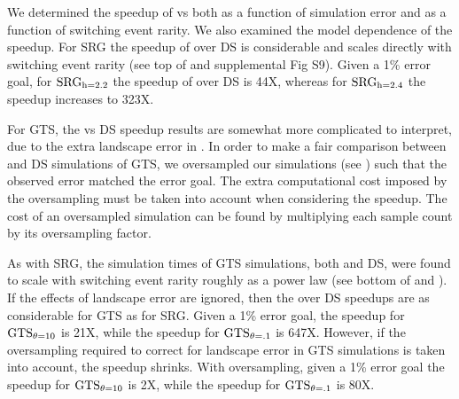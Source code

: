 We determined the speedup of  vs  both as a function of simulation error and as a function of switching event rarity. We also examined the model dependence of the speedup. For SRG the speedup of  over DS is considerable and scales directly with switching event rarity (see top of  and supplemental Fig S9). Given a 1\% error goal, for $\text{SRG}_\text{h=2.2}$ the speedup of  over DS is 44X, whereas for $\text{SRG}_\text{h=2.4}$ the speedup increases to 323X.

For GTS, the  vs DS speedup results are somewhat more complicated to interpret, due to the extra landscape error in . In order to make a fair comparison between  and DS simulations of GTS, we oversampled our  simulations (see ) such that the observed error matched the error goal. The extra computational cost imposed by the oversampling must be taken into account when considering the speedup. The cost of an oversampled  simulation can be found by multiplying each sample count by its oversampling factor.
    
As with SRG, the simulation times of GTS simulations, both  and DS, were found to scale with switching event rarity roughly as a power law (see bottom of  and ). If the effects of landscape error are ignored, then the  over DS speedups are as considerable for GTS as for SRG. Given a 1\% error goal, the speedup for $\text{GTS}_{\theta=10}$ is 21X, while the speedup for $\text{GTS}_{\theta=.1}$ is 647X. However, if the oversampling required to correct for landscape error in GTS simulations is taken into account, the  speedup shrinks. With oversampling, given a 1\% error goal the speedup for $\text{GTS}_{\theta=10}$ is 2X, while the speedup for $\text{GTS}_{\theta=.1}$ is 80X.


